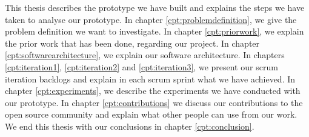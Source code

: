 This thesis describes the prototype we have built and explains the steps we have taken to analyse our prototype. In chapter \ref{cpt:problemdefinition}, we give the problem definition we want to investigate. In chapter \ref{cpt:priorwork}, we explain the prior work that has been done, regarding our project. In chapter \ref{cpt:softwarearchitecture}, we explain our software architecture. In chapters \ref{cpt:iteration1}, \ref{cpt:iteration2} and \ref{cpt:iteration3}, we present our scrum iteration backlogs and explain in each scrum sprint what we have achieved. In chapter \ref{cpt:experiments}, we describe the experiments we have conducted with our prototype. In chapter \ref{cpt:contributions} we discuss our contributions to the open source community and explain what other people can use from our work. We end this thesis with our conclusions in chapter \ref{cpt:conclusion}.